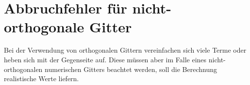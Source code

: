 






\section{Abbruchfehler für nicht-orthogonale Gitter}

Bei der Verwendung von orthogonalen Gittern vereinfachen sich viele Terme oder
heben sich mit der Gegenseite auf. Diese müssen aber im Falle eines nicht-orthogonalen
numerischen Gitters beachtet werden, soll die Berechnung realistische Werte liefern.

